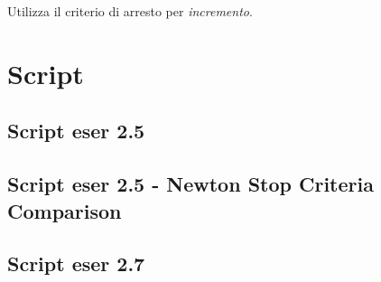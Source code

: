 Utilizza il criterio di arresto per \emph{incremento}.


\section{Script}
\subsection{Script eser 2.5}
\label{subsec:ScriptEser25}


\subsection{Script eser 2.5 - Newton Stop Criteria Comparison}
\label{subsec:ScriptEser25NewtonStopCriteriaComparison}


\subsection{Script eser 2.7}
\label{subsec:ScriptEser27}

